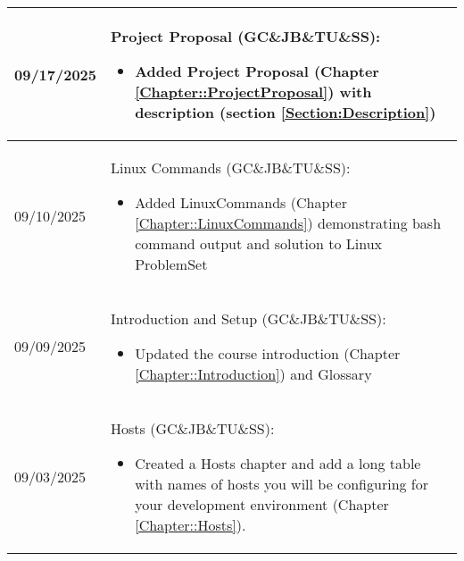 \begin{longtable}{|l||p{13.5cm}|}


09/17/2025 & Project Proposal (GC\&JB\&TU\&SS):
\begin{itemize}[topsep=0pt,itemsep=0pt,parsep=0pt,partopsep=0pt,leftmargin=12pt]
\item Added Project Proposal (Chapter \ref{Chapter::ProjectProposal}) with description (section \ref{Section:Description})
\end{itemize} 
\\ \hline

09/10/2025 & Linux Commands (GC\&JB\&TU\&SS):
\begin{itemize}[topsep=0pt,itemsep=0pt,parsep=0pt,partopsep=0pt,leftmargin=12pt]
\item Added LinuxCommands (Chapter \ref{Chapter::LinuxCommands}) demonstrating bash command output and solution to Linux ProblemSet
\end{itemize} 
\\ \hline

09/09/2025 & Introduction and Setup (GC\&JB\&TU\&SS):
\begin{itemize}[topsep=0pt,itemsep=0pt,parsep=0pt,partopsep=0pt,leftmargin=12pt]
\item Updated the course introduction (Chapter \ref{Chapter::Introduction}) and Glossary
\end{itemize} 
\\ \hline

09/03/2025 & Hosts (GC\&JB\&TU\&SS):
\begin{itemize}[topsep=0pt,itemsep=0pt,parsep=0pt,partopsep=0pt,leftmargin=12pt]
\item Created a Hosts chapter and add a long table with names of hosts you will be configuring for your development environment (Chapter \ref{Chapter::Hosts}).
\end{itemize} 
\\ \hline


\end{longtable}
